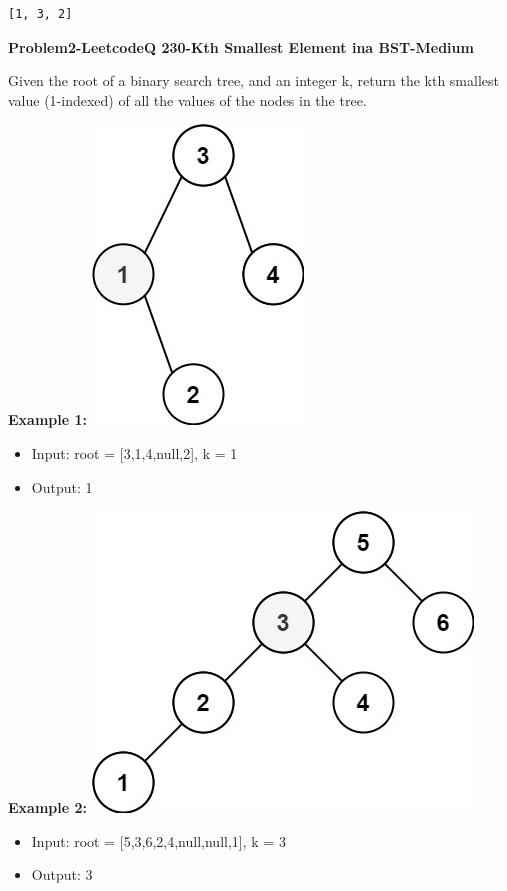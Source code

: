 \documentclass[11pt]{article}
\providecommand{\tightlist}{%
      \setlength{\itemsep}{0pt}\setlength{\parskip}{0pt}}
\begin{document}
    \begin{Verbatim}[commandchars=\\\{\}]
[1, 3, 2]
    \end{Verbatim}

    \textbf{Problem2-LeetcodeQ 230-Kth Smallest Element ina BST-Medium}

Given the root of a binary search tree, and an integer k, return the kth
smallest value (1-indexed) of all the values of the nodes in the tree.

\textbf{Example 1:}
\includegraphics{7e8608b0-cb25-4352-ba0e-8f579aef1000.jpg}

\begin{itemize}
\tightlist
\item
  Input: root = {[}3,1,4,null,2{]}, k = 1
\item
  Output: 1
\end{itemize}

\textbf{Example 2:}
\includegraphics{41ccb892-f4bc-48f5-acbf-3896271d38a1.jpg}

\begin{itemize}
\tightlist
\item
  Input: root = {[}5,3,6,2,4,null,null,1{]}, k = 3
\item
  Output: 3
\end{itemize}
\end{document}
